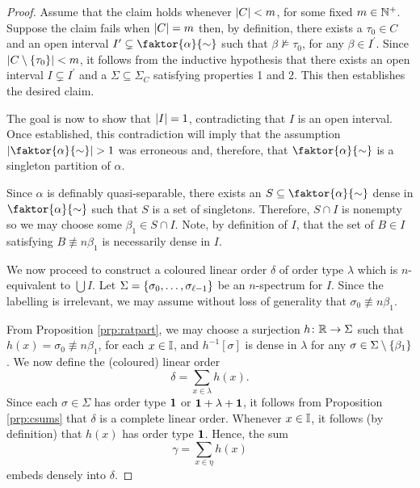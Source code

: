 \begin{proof}
	Assume that the claim holds whenever $\left\lvert C\right\rvert<m$, for some fixed
	$m\in\mathbb{N}^{+}$.  Suppose the claim fails when $\left\lvert C\right\rvert=m$ then, by definition,
	there exists a $\tau_0\in C$ and an open interval
	$I^\prime\subsetneq\faktor{\alpha}{\sim}$ such that
	$\beta\not\models\tau_0$, for any $\beta\in I^\prime$.  Since
	$\left\lvert C\setminus\left\lbrace \tau_0\right\rbrace\right\rvert<m$, it follows from the inductive hypothesis that
	there exists an open interval $I\subsetneq I^\prime$ and a
	$\Sigma\subseteq\Sigma_C$ satisfying properties 1 and 2.  This then
	establishes the desired claim.

	\smallskip	The goal is now to show that $\left\lvert I\right\rvert=1$, contradicting that
	$I$ is an open interval.  Once established, this contradiction will imply
	that the assumption $\card{\faktor{\alpha}{\sim}}>1$ was erroneous and,
	therefore, that $\faktor{\alpha}{\sim}$ is a singleton partition of
	$\alpha$.

	Since $\alpha$ is definably quasi-separable, there exists an
	$S\subseteq\faktor{\alpha}{\sim}$ dense in $\faktor{\alpha}{\sim}$ such that $S$
	is a set of singletons.  Therefore, $S\cap I$ is nonempty so we may choose some
	$\beta_{1}\in S\cap I$. Note, by definition of $I$, that the
	set of $B\in I$ satisfying $B\nequiv{n}\beta_{1}$ is necessarily dense in $I$.

	We now proceed to construct a coloured linear order $\delta$ of order type
	$\lambda$ which is $n$-equivalent to $\bigcup I$.  Let
	$\Sigma=\left\lbrace \sigma_0,\dotsc,\sigma_{\ell-1}\right\rbrace$ be an $n$-spectrum for
	$I$.  Since the labelling is irrelevant, we may assume
	without loss of generality that $\sigma_{0}\nequiv{n}\beta_{1}$.

	From Proposition \ref{prp:ratpart}, we may choose a surjection
	$h\colon\mathbb{R}\to\Sigma$ such that $h(x)=\sigma_0\nequiv{n}\beta_1$, for each
	$x\in\mathbb{I}$, and $h^{-1}[\sigma]$ is dense in $\lambda$ for any
	$\sigma\in\Sigma\setminus\left\lbrace \beta_1\right\rbrace$. We now define the (coloured) linear
	order
	\begin{equation}
		\delta=\sum_{x\in\lambda}h(x).
	\end{equation}
	Since each $\sigma\in\Sigma$ has order type $\mathbf{1}$ or $\mathbf{1}+\lambda+\mathbf{1}$,
	it follows from Proposition \ref{prp:csums} that $\delta$ is a complete
	linear order.  Whenever $x\in\mathbb{I}$, it follows (by definition) that
	$h(x)$ has order type $\mathbf{1}$.  Hence, the sum
	\begin{equation}
		\gamma=\sum_{x\in\eta}h(x)
	\end{equation}
	embeds densely into $\delta$.


\end{proof}
